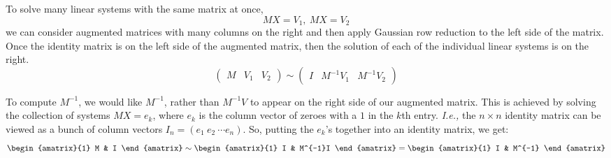To solve many linear systems with the same matrix at once, 
\[MX=V_1,~MX=V_2\]
we can consider augmented matrices with 
many columns on the right 
 and then apply Gaussian row reduction to the left side of the matrix.  Once the identity matrix is on the left side of the augmented matrix, then the solution of each of the individual linear systems is on the right.
 \[
\left(\begin{array}{c|cc}
\!M & V_1&V_2\!
\end{array}\right)
\sim
\left(\begin{array}{c|cc}
\!I & M^{-1}V_1 & M^{-1}V_2\!
\end{array}\right)
\]


To compute $M^{-1}$, we would like $M^{-1}$, rather than $M^{-1}V$ to appear on the right side of our augmented matrix.
This is achieved by  solving the collection of systems $MX=e_k$, where $e_k$ is the column vector of zeroes with a $1$ in the $k$th entry.  
{\itshape I.e.,} the $n\times n$ identity matrix can be viewed as a bunch of column vectors $I_n=(e_1 \ e_2 \ \cdots e_n)$. So, putting the $e_k$'s together into an identity matrix, we get:
\[
\begin{amatrix}{1}
M & I
\end{amatrix}
\sim
\begin{amatrix}{1}
I & M^{-1}I
\end{amatrix}
=\begin{amatrix}{1}
I & M^{-1}
\end{amatrix}
\]


